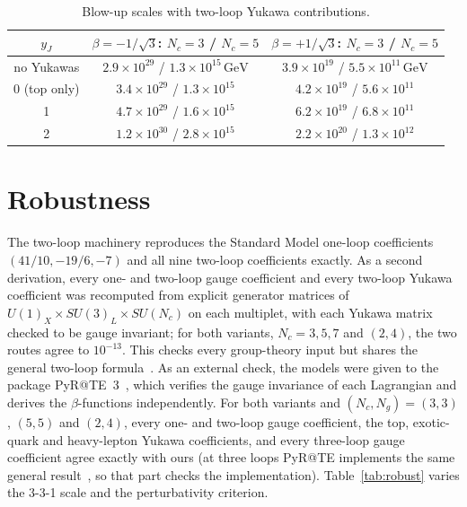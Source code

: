 \documentclass[11pt,a4paper]{article}
\newcommand{\Nc}{N_c}
\newcommand{\Ng}{N_g}
\newcommand{\GeV}{\,\mathrm{GeV}}
\begin{document}
\begin{table}[h]\centering
\begin{tabular}{ccc}
\toprule
$y_J$ & $\beta=-1/\sqrt3$: $\Nc=3$ / $\Nc=5$ & $\beta=+1/\sqrt3$: $\Nc=3$ / $\Nc=5$\\
\midrule
no Yukawas & $2.9\times10^{29}$ / $1.3\times10^{15}\GeV$ & $3.9\times10^{19}$ / $5.5\times10^{11}\GeV$\\
0 (top only) & $3.4\times10^{29}$ / $1.3\times10^{15}$ & $4.2\times10^{19}$ / $5.6\times10^{11}$\\
1 & $4.7\times10^{29}$ / $1.6\times10^{15}$ & $6.2\times10^{19}$ / $6.8\times10^{11}$\\
2 & $1.2\times10^{30}$ / $2.8\times10^{15}$ & $2.2\times10^{20}$ / $1.3\times10^{12}$\\
\bottomrule
\end{tabular}
\caption{Blow-up scales with two-loop Yukawa contributions.}\label{tab:yuk}
\end{table}

\section{Robustness}\label{sec:robust}

The two-loop machinery reproduces the Standard Model one-loop coefficients
$(41/10,-19/6,-7)$ and all nine two-loop coefficients exactly. As a second derivation,
every one- and two-loop gauge coefficient and every two-loop Yukawa coefficient was
recomputed from explicit generator matrices of $U(1)_X\times SU(3)_L\times SU(\Nc)$ on
each multiplet, with each Yukawa matrix checked to be gauge invariant; for both variants,
$\Nc=3,5,7$ and $(2,4)$, the two routes agree to $10^{-13}$. This checks every group-theory
input but shares the general two-loop formula~\cite{Machacek:1983tz}. As an external check,
the models were given to the package PyR@TE~3~\cite{Sartore:2020gou}, which verifies the
gauge invariance of each Lagrangian and derives the $\beta$-functions independently. For
both variants and $(\Nc,\Ng)=(3,3)$, $(5,5)$ and $(2,4)$, every one- and two-loop gauge
coefficient, the top, exotic-quark and heavy-lepton Yukawa coefficients, and every
three-loop gauge coefficient agree exactly with ours (at three loops PyR@TE implements the
same general result~\cite{Poole:2019kcm}, so that part checks the implementation).
Table~\ref{tab:robust}
varies the 3-3-1 scale and the perturbativity criterion.
\end{document}
